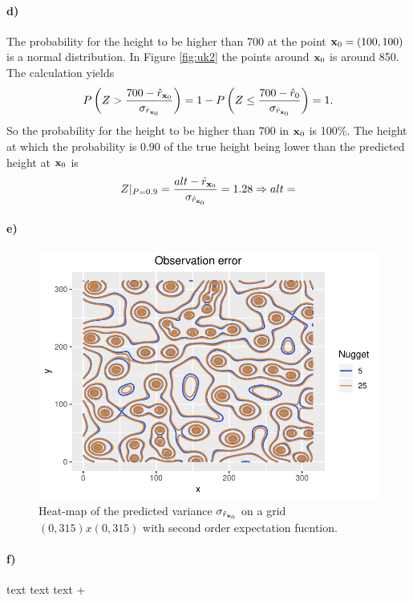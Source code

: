 \paragraph{d)}
The probability for the height to be higher than 700 at the point $\boldsymbol{\mathbf{x}}_0 = (100,100)$ is a normal distribution. In Figure \ref{fig:uk2} the points around $\boldsymbol{\mathbf{x}}_0$ is around 850. The calculation yields 
\begin{equation*}
    P\left(Z>\frac{700 - \hat{r}_{\boldsymbol{\mathbf{x}}_0}}{\sigma_{\hat{r}_{\boldsymbol{\mathbf{x}}_0}}}\right) = 1-P\left(Z\leq\frac{700 - \hat{r}_0}{\sigma_{\hat{r}_{\boldsymbol{\mathbf{x}}_0}}}\right) = 1.
\end{equation*}
So the probability for the height to be higher than 700 in $\boldsymbol{\mathbf{x}}_0$ is 100\%.
The height at which the probability is 0.90 of the true height being lower than the predicted height at $\boldsymbol{\mathbf{x}}_0$ is
\begin{equation*}
    Z|_{P = 0.9} = \frac{alt - \hat{r}_{\boldsymbol{\mathbf{x}}_0}}{\sigma_{\hat{r}_{\boldsymbol{\mathbf{x}}_0}}} = 1.28 \Rightarrow alt = 
\end{equation*}


\paragraph{e)}
\begin{figure}[htb]
    \centering
    \includegraphics{figures/nugget.pdf}
    \caption{Heat-map of the predicted variance $\sigma_{\hat{r}_{\boldsymbol{\mathbf{x}}_0}}$ on a grid $(0,315)x(0,315)$ with second order expectation fucntion.}
    \label{fig:nugget}
\end{figure}
\paragraph{f)}
text text text
+